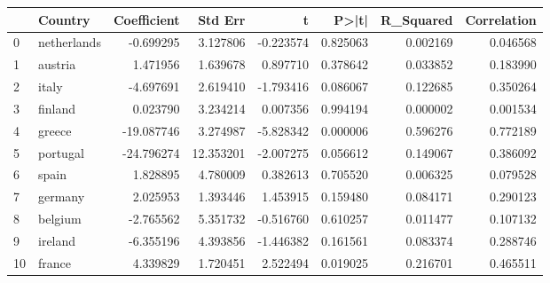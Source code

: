 \begin{tabular}{llrrrrrr}
\toprule
 & Country & Coefficient & Std Err & t & P>|t| & R_Squared & Correlation \\
\midrule
0 & netherlands & -0.699295 & 3.127806 & -0.223574 & 0.825063 & 0.002169 & 0.046568 \\
1 & austria & 1.471956 & 1.639678 & 0.897710 & 0.378642 & 0.033852 & 0.183990 \\
2 & italy & -4.697691 & 2.619410 & -1.793416 & 0.086067 & 0.122685 & 0.350264 \\
3 & finland & 0.023790 & 3.234214 & 0.007356 & 0.994194 & 0.000002 & 0.001534 \\
4 & greece & -19.087746 & 3.274987 & -5.828342 & 0.000006 & 0.596276 & 0.772189 \\
5 & portugal & -24.796274 & 12.353201 & -2.007275 & 0.056612 & 0.149067 & 0.386092 \\
6 & spain & 1.828895 & 4.780009 & 0.382613 & 0.705520 & 0.006325 & 0.079528 \\
7 & germany & 2.025953 & 1.393446 & 1.453915 & 0.159480 & 0.084171 & 0.290123 \\
8 & belgium & -2.765562 & 5.351732 & -0.516760 & 0.610257 & 0.011477 & 0.107132 \\
9 & ireland & -6.355196 & 4.393856 & -1.446382 & 0.161561 & 0.083374 & 0.288746 \\
10 & france & 4.339829 & 1.720451 & 2.522494 & 0.019025 & 0.216701 & 0.465511 \\
\bottomrule
\end{tabular}
